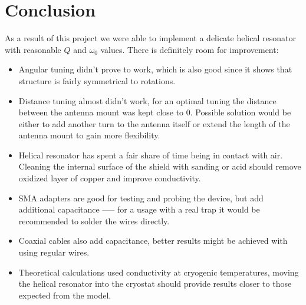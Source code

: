 \chapter{Conclusion}

As a result of this project we were able to implement a delicate helical resonator with reasonable $Q$ and $\omega_0$ values. There is definitely room for improvement:

\begin{itemize}
	\item Angular tuning didn't prove to work, which is also good since it shows that structure is fairly symmetrical to rotations.
	\item Distance tuning almost didn't work, for an optimal tuning the distance between the antenna mount was kept close to 0. Possible solution would be either to add another turn to the antenna itself or extend the length of the antenna mount to gain more flexibility.
	\item Helical resonator has spent a fair share of time being in contact with air. Cleaning the internal surface of the shield with sanding or acid should remove oxidized layer of copper and improve conductivity.
	\item SMA adapters are good for testing and probing the device, but add additional capacitance ––– for a usage with a real trap it would be recommended to solder the wires directly.
	\item Coaxial cables also add capacitance, better results might be achieved with using regular wires.
	\item Theoretical calculations used conductivity at cryogenic temperatures, moving the helical resonator into the cryostat should provide results closer to those expected from the model.
\end{itemize}